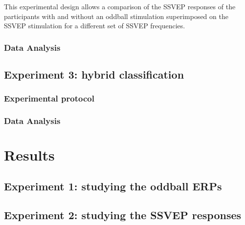 \documentclass[10pt]{article}
\begin{document}
        This experimental design allows a comparison of the \ac{SSVEP} responses of the participants with and without an oddball stimulation superimposed on the \ac{SSVEP} stimulation for a different set of \ac{SSVEP} frequencies.


        \subsubsection{Data Analysis}
        \label{sec:2.3.2Analysis}





    \subsection{Experiment 3: hybrid classification}
    \label{sec:2.4Hybrid}

        \subsubsection{Experimental protocol}
        \label{sec:2.4.1Protocol}

        \subsubsection{Data Analysis}
        \label{sec:2.4.2Analysis}

\section{Results}
\label{sec:3Results}

    \subsection{Experiment 1: studying the oddball \acsp{ERP}}
    \label{sec:2.2Oddball}


    \subsection{Experiment 2: studying the \acs{SSVEP} responses}
    \label{sec:2.3SSVEP}
\end{document}
